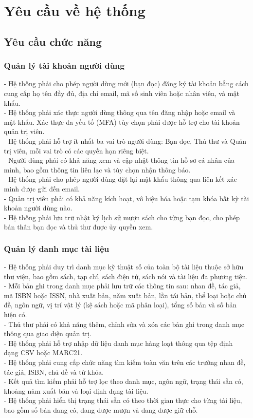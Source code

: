\section{Yêu cầu về hệ thống}
\subsection{Yêu cầu chức năng}
\subsubsection{Quản lý tài khoản người dùng}
- Hệ thống phải cho phép người dùng mới (bạn đọc) đăng ký tài khoản bằng cách cung cấp họ tên đầy đủ, địa chỉ email, mã số sinh viên hoặc nhân viên, và mật khẩu. \\
- Hệ thống phải xác thực người dùng thông qua tên đăng nhập hoặc email và mật khẩu. Xác thực đa yếu tố (MFA) tùy chọn phải được hỗ trợ cho tài khoản quản trị viên. \\
- Hệ thống phải hỗ trợ ít nhất ba vai trò người dùng: Bạn đọc, Thủ thư và Quản trị viên, mỗi vai trò có các quyền hạn riêng biệt.\\
- Người dùng phải có khả năng xem và cập nhật thông tin hồ sơ cá nhân của mình, bao gồm thông tin liên lạc và tùy chọn nhận thông báo.\\
- Hệ thống phải cho phép người dùng đặt lại mật khẩu thông qua liên kết xác minh được gửi đến email.\\
- Quản trị viên phải có khả năng kích hoạt, vô hiệu hóa hoặc tạm khóa bất kỳ tài khoản người dùng nào.\\
- Hệ thống phải lưu trữ nhật ký lịch sử mượn sách cho từng bạn đọc, cho phép bản thân bạn đọc và thủ thư được ủy quyền xem.\\

\subsubsection{ Quản lý danh mục tài liệu}
- Hệ thống phải duy trì danh mục kỹ thuật số của toàn bộ tài liệu thuộc sở hữu thư viện, bao gồm sách, tạp chí, sách điện tử, sách nói và tài liệu đa phương tiện.\\
- Mỗi bản ghi trong danh mục phải lưu trữ các thông tin sau: nhan đề, tác giả, mã ISBN hoặc ISSN, nhà xuất bản, năm xuất bản, lần tái bản, thể loại hoặc chủ đề, ngôn ngữ, vị trí vật lý (kệ sách hoặc mã phân loại), tổng số bản và số bản hiện có.\\
- Thủ thư phải có khả năng thêm, chỉnh sửa và xóa các bản ghi trong danh mục thông qua giao diện quản trị.\\
- Hệ thống phải hỗ trợ nhập dữ liệu danh mục hàng loạt thông qua tệp định dạng CSV hoặc MARC21.\\
- Hệ thống phải cung cấp chức năng tìm kiếm toàn văn trên các trường nhan đề, tác giả, ISBN, chủ đề và từ khóa.\\
- Kết quả tìm kiếm phải hỗ trợ lọc theo danh mục, ngôn ngữ, trạng thái sẵn có, khoảng năm xuất bản và loại định dạng tài liệu.\\
- Hệ thống phải hiển thị trạng thái sẵn có theo thời gian thực cho từng tài liệu, bao gồm số bản đang có, đang được mượn và đang được giữ chỗ.\\

